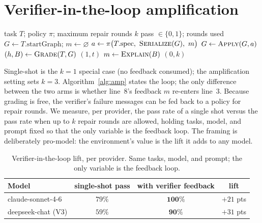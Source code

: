 \documentclass{article}
\begin{document}
\section{Verifier-in-the-loop amplification}
\label{sec:amp}

\begin{algorithm}[t]
\caption{$\textsc{Rollout}(T, \pi, k)$: verifier-in-the-loop repair}
\label{alg:amp}
\begin{algorithmic}[1]
\Require task $T$; policy $\pi$; maximum repair rounds $k$
\Ensure pass $\in\{0,1\}$; rounds used
\State $G \gets T.\text{startGraph}$; \quad $m \gets \varnothing$ 
  \State $a \gets \pi\big(T.\text{spec},\ \textsc{Serialize}(G),\ m\big)$ 
  \State $G \gets \textsc{Apply}(G, a)$
  \State $(h, B) \gets \textsc{Grade}(T, G)$
   \Return $(1, t)$ \EndIf
  \State $m \gets \textsc{Explain}(B)$ 
\EndFor
\State \Return $(0, k)$
\end{algorithmic}
\end{algorithm}

Single-shot is the $k{=}1$ special case (no feedback consumed); the amplification setting sets $k{=}3$. Algorithm~\ref{alg:amp} states the loop; the only difference between the two arms is whether line~8's feedback $m$ re-enters line~3.
Because grading is free, the verifier's failure messages can be fed back to a policy for repair rounds. We measure, per provider, the pass rate of a single shot versus the pass rate when up to $k$ repair rounds are allowed, holding tasks, model, and prompt fixed so that the only variable is the feedback loop. The framing is deliberately pro-model: the environment's value is the lift it adds to any model.

\begin{table}[h]
\centering
\begin{tabular}{lccc}
\toprule
Model & single-shot pass & with verifier feedback & lift \\
\midrule
claude-sonnet-4-6 & $79\%$ & $\mathbf{100\%}$ & $+21$ pts \\
deepseek-chat (V3) & $59\%$ & $\mathbf{90\%}$ & $+31$ pts \\
\bottomrule
\end{tabular}
\caption{Verifier-in-the-loop lift, per provider. Same tasks, model, and prompt; the only variable is the feedback loop.}
\end{table}
\end{document}
